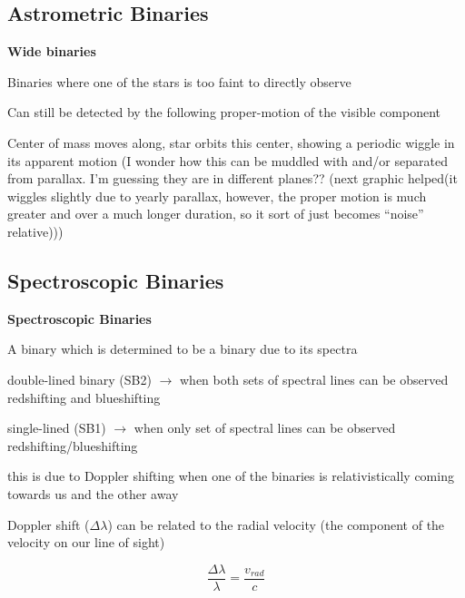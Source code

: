 \documentclass{article}
\begin{document}
\subsection{Astrometric Binaries}
\noindent \textbf{\large Wide binaries} 
\begin{list}{-}{}
\item Binaries where one of the stars is too faint to directly observe
\item Can still be detected by the following \gls{proper-motion} of the visible component
\item Center of mass moves along, star orbits this center, showing a periodic wiggle in its apparent motion (I wonder how this can be muddled with and/or separated from parallax. I'm guessing they are in different planes?? (next graphic helped(it wiggles slightly due to yearly parallax, however, the proper motion is much greater and over a much longer duration, so it sort of just becomes ``noise'' relative)))
\end{list}
\subsection{Spectroscopic Binaries}
\noindent \textbf{\large Spectroscopic Binaries}
\begin{list}{-}{}
\item A binary which is determined to be a binary due to its spectra
\item double-lined binary (SB2) \(\rightarrow\) when both sets of spectral lines can be observed redshifting and blueshifting
\item single-lined (SB1) \(\rightarrow\) when only set of spectral lines can be observed redshifting/blueshifting
\item this is due to Doppler shifting when one of the binaries is relativistically coming towards us and the other away
\item Doppler shift (\(\Delta\lambda\)) can be related to the radial velocity (the component of the velocity on our line of sight)
\item \[\frac{\Delta\lambda}{\lambda} = \frac{v_{rad}}{c}\]
\end{list}
\end{document}
